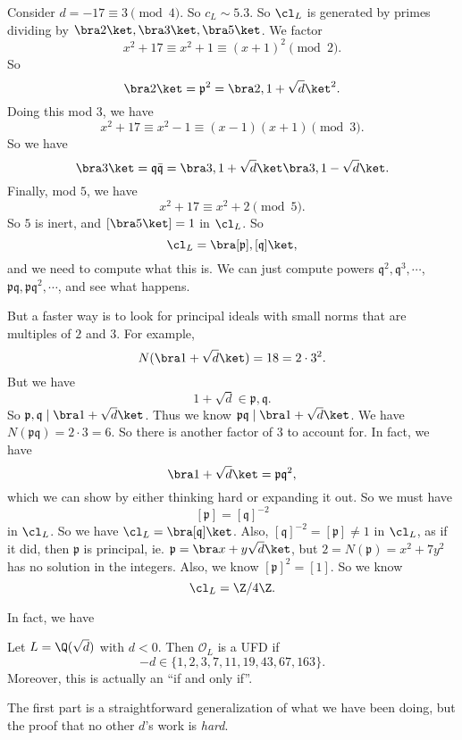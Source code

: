 \documentclass[a4paper]{article}
\begin{document}
\begin{eg}
  Consider $d = -17 \equiv 3 \pmod 4$. So $c_L \sim 5.3$. So $\cl_L$ is generated by primes dividing by $\bra 2\ket, \bra 3\ket, \bra 5\ket$. We factor
  \[
    x^2 + 17 \equiv x^2 + 1 \equiv (x + 1)^2 \pmod 2.
  \]
  So
  \[
    \bra 2\ket = \mathfrak{p}^2 = \bra 2, 1 + \sqrt{d}\ket^2.
  \]
  Doing this mod $3$, we have
  \[
    x^2 + 17 \equiv x^2 - 1 \equiv (x - 1)(x + 1) \pmod 3.
  \]
  So we have
  \[
    \bra 3\ket = \mathfrak{q}\bar{\mathfrak{q}} = \bra 3, 1 + \sqrt{d}\ket \bra 3, 1 - \sqrt{d}\ket.
  \]
  Finally, mod $5$, we have
  \[
    x^2 + 17 \equiv x^2 + 2 \pmod 5.
  \]
  So $5$ is inert, and $[\bra 5\ket] = 1$ in $\cl_L$. So
  \[
    \cl_L = \bra [\mathfrak{p}], [\mathfrak{q}]\ket,
  \]
  and we need to compute what this is. We can just compute powers $\mathfrak{q}^2, \mathfrak{q}^3, \cdots$, $\mathfrak{p}\mathfrak{q}, \mathfrak{p}\mathfrak{q}^2, \cdots$, and see what happens.

  But a faster way is to look for principal ideals with small norms that are multiples of $2$ and $3$. For example,
  \[
    N(\bra 1 + \sqrt{d}\ket) = 18 = 2 \cdot 3^2.
  \]
  But we have
  \[
    1 + \sqrt{d} \in \mathfrak{p}, \mathfrak{q}.
  \]
  So $\mathfrak{p}, \mathfrak{q} \mid \bra 1 + \sqrt{d}\ket$. Thus we know $\mathfrak{p}\mathfrak{q} \mid \bra 1 + \sqrt{d}\ket$. We have $N(\mathfrak{p}\mathfrak{q}) = 2 \cdot 3 = 6$. So there is another factor of $3$ to account for. In fact, we have
  \[
    \bra 1 + \sqrt{d}\ket = \mathfrak{p}\mathfrak{q}^2,
  \]
  which we can show by either thinking hard or expanding it out. So we must have
  \[
    [\mathfrak{p}] = [\mathfrak{q}]^{-2}
  \]
  in $\cl_L$. So we have $\cl_L = \bra [\mathfrak{q}]\ket$. Also, $[\mathfrak{q}]^{-2} = [\mathfrak{p}] \not= 1$ in $\cl_L$, as if it did, then $\mathfrak{p}$ is principal, ie. $\mathfrak{p} = \bra x + y\sqrt{d}\ket$, but $2 = N(\mathfrak{p}) = x^2 + 7y^2$ has no solution in the integers. Also, we know $[\mathfrak{p}]^2 = [1]$. So we know
  \[
    \cl_L = \Z/4\Z.
  \]
\end{eg}

In fact, we have
\begin{thm}
  Let $L = \Q(\sqrt{d})$ with $d < 0$. Then $\mathcal{O}_L$ is a UFD if
  \[
    -d \in \{1, 2, 3, 7, 11, 19, 43, 67, 163\}.
  \]
  Moreover, this is actually an ``if and only if''.
\end{thm}
The first part is a straightforward generalization of what we have been doing, but the proof that no other $d$'s work is \emph{hard}.
\end{document}
